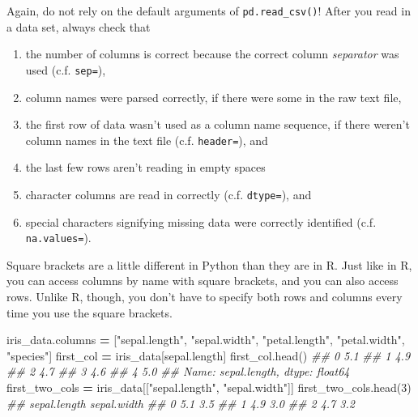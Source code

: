 \documentclass[
  12pt,
  krantz2]{krantz}
\makeatletter
\newenvironment{Shaded}{\begin{snugshade}}{\end{snugshade}}
\newcommand{\CommentTok}[1]{\textcolor[rgb]{0.37,0.37,0.37}{\textit{#1}}}
\newcommand{\DecValTok}[1]{\textcolor[rgb]{0.06,0.06,0.06}{#1}}
\newcommand{\NormalTok}[1]{#1}
\newcommand{\OperatorTok}[1]{\textcolor[rgb]{0.43,0.43,0.43}{\textbf{#1}}}
\newcommand{\StringTok}[1]{\textcolor[rgb]{0.5,0.5,0.5}{#1}}
\providecommand{\tightlist}{%
  \setlength{\itemsep}{0pt}\setlength{\parskip}{0pt}}
\newenvironment{kframe}{%
\medskip{}
\setlength{\fboxsep}{.8em}
 \def\at@end@of@kframe{}%
 \ifinner\ifhmode%
  \def\at@end@of@kframe{\end{minipage}}%
  \begin{minipage}{\columnwidth}%
 \fi\fi%
 \def\FrameCommand##1{\hskip\@totalleftmargin \hskip-\fboxsep
 \colorbox{shadecolor}{##1}\hskip-\fboxsep
     \hskip-\linewidth \hskip-\@totalleftmargin \hskip\columnwidth}%
 \MakeFramed {\advance\hsize-\width
   \@totalleftmargin\z@ \linewidth\hsize
   \@setminipage}}%
 {\par\unskip\endMakeFramed%
 \at@end@of@kframe}
\renewenvironment{Shaded}{\begin{kframe}}{\end{kframe}}
\newenvironment{rmd-caution}{\begin{lrbox}{\rmdbox}
  \minipage[c]{\dimexpr \textwidth-2\fboxrule-\wd\excl-\columnsep}
    \vspace*{\columnsep}}%
{\vspace*{\columnsep}\endminipage\end{lrbox}%
  {\par\color{yellow}\fboxsep=0pt
    \fbox{\usebox\excl\usebox\rmdbox\hspace{\columnsep}}\par}}
\makeatother
\begin{document}
\begin{rmd-caution}

Again, do not rely on the default arguments of \texttt{pd.read\_csv()}! After you read in a data set, always check that

\begin{enumerate}
\def\labelenumi{\arabic{enumi}.}
\tightlist
\item
  the number of columns is correct because the correct column \emph{separator} was used (c.f. \texttt{sep=}),
\item
  column names were parsed correctly, if there were some in the raw text file,
\item
  the first row of data wasn't used as a column name sequence, if there weren't column names in the text file (c.f. \texttt{header=}), and
\item
  the last few rows aren't reading in empty spaces
\item
  character columns are read in correctly (c.f. \texttt{dtype=}), and
\item
  special characters signifying missing data were correctly identified (c.f. \texttt{na.values=}).
\end{enumerate}

\end{rmd-caution}

Square brackets are a little different in Python than they are in R. Just like in R, you can access columns by name with square brackets, and you can also access rows. Unlike R, though, you don't have to specify both rows and columns every time you use the square brackets.

\begin{Shaded}
\begin{Highlighting}[]
\NormalTok{iris\_data.columns }\OperatorTok{=}\NormalTok{ [}\StringTok{"sepal.length"}\NormalTok{, }\StringTok{"sepal.width"}\NormalTok{, }\StringTok{"petal.length"}\NormalTok{, }
                     \StringTok{"petal.width"}\NormalTok{, }\StringTok{"species"}\NormalTok{]}
\NormalTok{first\_col }\OperatorTok{=}\NormalTok{ iris\_data[}\StringTok{\textquotesingle{}sepal.length\textquotesingle{}}\NormalTok{]}
\NormalTok{first\_col.head()}
\CommentTok{\#\# 0    5.1}
\CommentTok{\#\# 1    4.9}
\CommentTok{\#\# 2    4.7}
\CommentTok{\#\# 3    4.6}
\CommentTok{\#\# 4    5.0}
\CommentTok{\#\# Name: sepal.length, dtype: float64}
\NormalTok{first\_two\_cols }\OperatorTok{=}\NormalTok{ iris\_data[[}\StringTok{"sepal.length"}\NormalTok{, }\StringTok{"sepal.width"}\NormalTok{]]}
\NormalTok{first\_two\_cols.head(}\DecValTok{3}\NormalTok{)}
\CommentTok{\#\#    sepal.length  sepal.width}
\CommentTok{\#\# 0           5.1          3.5}
\CommentTok{\#\# 1           4.9          3.0}
\CommentTok{\#\# 2           4.7          3.2}
\end{Highlighting}
\end{Shaded}
\end{document}
